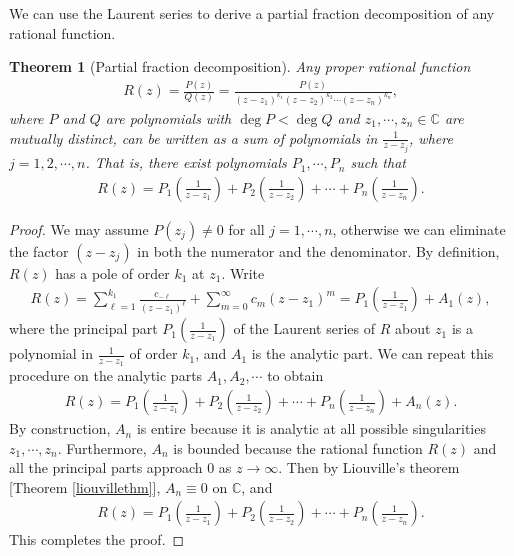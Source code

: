 \documentclass{article}
\numberwithin{equation}{section}
\newcommand{\bbC}{\mathbb{C}}
\theoremstyle{plain}
\newtheorem{theorem}{Theorem}[section]
\theoremstyle{definition}
\begin{document}
We can use the Laurent series to derive a partial fraction decomposition of any rational function.
\begin{theorem}[Partial fraction decomposition]
Any proper rational function
\begin{align*}
	R(z)=\frac{P(z)}{Q(z)}=\frac{P(z)}{(z-z_1)^{k_1}(z-z_2)^{k_2}\cdots(z-z_n)^{k_n}},
\end{align*}
where $P$ and $Q$ are polynomials with $\deg P<\deg Q$ and $z_1,\cdots,z_n\in\bbC$ are mutually distinct, can be written as a sum of polynomials in $\frac{1}{z-z_j}$, where $j=1,2,\cdots,n$. That is, there exist polynomials $P_1,\cdots,P_n$ such that
\begin{align*}
	R(z)=P_1\left(\frac{1}{z-z_1}\right)+P_2\left(\frac{1}{z-z_2}\right)+\cdots+P_n\left(\frac{1}{z-z_n}\right).
\end{align*}
\end{theorem}
\begin{proof}
We may assume $P(z_j)\neq 0$ for all $j=1,\cdots,n$, otherwise we can eliminate the factor $(z-z_j)$ in both the numerator and the denominator. By definition, $R(z)$ has a pole of order $k_1$ at $z_1$. Write
\begin{align*}
	R(z)=\sum_{\ell=1}^{k_1}\frac{c_{-\ell}}{(z-z_1)^\ell}+\sum_{m=0}^\infty c_m(z-z_1)^m=P_1\left(\frac{1}{z-z_1}\right)+A_1(z),
\end{align*}
where the principal part $P_1(\frac{1}{z-z_1})$ of the Laurent series of $R$ about $z_1$ is a polynomial in $\frac{1}{z-z_1}$ of order $k_1$, and $A_1$ is the analytic part. We can repeat this procedure on the analytic parts $A_1,A_2,\cdots$ to obtain
\begin{align*}
	R(z)=P_1\left(\frac{1}{z-z_1}\right)+P_2\left(\frac{1}{z-z_2}\right)+\cdots+P_n\left(\frac{1}{z-z_n}\right)+A_n(z).
\end{align*} 
By construction, $A_n$ is entire because it is analytic at all possible singularities $z_1,\cdots,z_n$. Furthermore, $A_n$ is bounded because the rational function $R(z)$ and all the principal parts approach $0$ as $z\to\infty$. Then by Liouville's theorem [Theorem \ref{liouvillethm}], $A_n\equiv 0$ on $\bbC$, and 
\begin{align*}
	R(z)=P_1\left(\frac{1}{z-z_1}\right)+P_2\left(\frac{1}{z-z_2}\right)+\cdots+P_n\left(\frac{1}{z-z_n}\right).
\end{align*} 
This completes the proof.
\end{proof}
\end{document}
